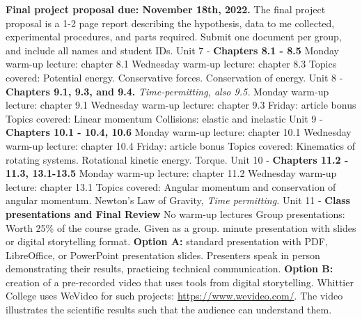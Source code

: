 \documentclass[10pt]{article}
\begin{document}
\begin{outline}[enumerate]
\1 \textbf{Final project proposal due: November 18th, 2022.}  The final project proposal is a 1-2 page report describing the hypothesis, data to me collected, experimental procedures, and parts required.  Submit one document per group, and include all names and student IDs.
\1 Unit 7 - \textbf{Chapters 8.1 - 8.5}
\2 Monday warm-up lecture: chapter 8.1
\2 Wednesday warm-up lecture: chapter 8.3
\2 Topics covered:
\3 Potential energy.
\3 Conservative forces.
\3 Conservation of energy.
\1 Unit 8 - \textbf{Chapters 9.1, 9.3, and 9.4.} \textit{Time-permitting, also 9.5.}
\2 Monday warm-up lecture: chapter 9.1
\2 Wednesday warm-up lecture: chapter 9.3
\2 Friday: article bonus
\2 Topics covered:
\3 Linear momentum
\3 Collisions: elastic and inelastic
\1 Unit 9 - \textbf{Chapters 10.1 - 10.4, 10.6}
\2 Monday warm-up lecture: chapter 10.1
\2 Wednesday warm-up lecture: chapter 10.4
\2 Friday: article bonus
\2 Topics covered:
\3 Kinematics of rotating systems.
\3 Rotational kinetic energy.
\3 Torque.
\1 Unit 10 - \textbf{Chapters 11.2 - 11.3, 13.1-13.5}
\2 Monday warm-up lecture: chapter 11.2
\2 Wednesday warm-up lecture: chapter 13.1
\2 Topics covered:
\3 Angular momentum and conservation of angular momentum.
\3 Newton's Law of Gravity, \textit{Time permitting.}
\1 Unit 11 - \textbf{Class presentations and Final Review}
\2 No warm-up lectures
\2 Group presentations:
\3 Worth 25\% of the course grade.
\3 Given as a group.
 minute presentation with slides or digital storytelling format.
\3 \textbf{Option A:} standard presentation with PDF, LibreOffice, or PowerPoint presentation slides. Presenters speak in person demonstrating their results, practicing technical communication.
\3 \textbf{Option B:} creation of a pre-recorded video that uses tools from digital storytelling.  Whittier College uses WeVideo for such projects: \url{https://www.wevideo.com/}.  The video illustrates the scientific results such that the audience can understand them.
\end{outline}
\end{document}

